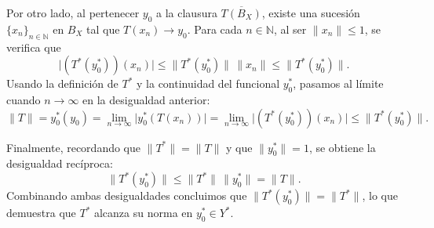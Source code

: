 \documentclass[12pt]{article}
\begin{document}
\begin{ejercicio}
        Por otro lado, al pertenecer $y_0$ a la clausura $\overline{T(B_X)}$, existe una sucesión $\{x_n\}_{n \in \mathbb{N}}$ en $B_X$ tal que $T(x_n) \to y_0$. Para cada $n \in \mathbb{N}$, al ser $\|x_n\| \leq 1$, se verifica que
        \begin{equation*}
            \bigl|(T^\ast(y_0^\ast))(x_n)\bigr| \leq \|T^\ast(y_0^\ast)\| \, \|x_n\| \leq \|T^\ast(y_0^\ast)\|.
        \end{equation*}
        Usando la definición de $T^\ast$ y la continuidad del funcional $y_0^\ast$, pasamos al límite cuando $n \to \infty$ en la desigualdad anterior:
        \begin{equation*}
            \|T\| = y_0^\ast(y_0) = \lim_{n \to \infty} \bigl|y_0^\ast(T(x_n))\bigr| = \lim_{n \to \infty} \bigl|(T^\ast(y_0^\ast))(x_n)\bigr| \leq \|T^\ast(y_0^\ast)\|.
        \end{equation*}

        Finalmente, recordando que $\|T^\ast\| = \|T\|$ y que $\|y_0^\ast\| = 1$, se obtiene la desigualdad recíproca:
        \begin{equation*}
            \|T^\ast(y_0^\ast)\| \leq \|T^\ast\| \, \|y_0^\ast\| = \|T\|.
        \end{equation*}
        Combinando ambas desigualdades concluimos que $\|T^\ast(y_0^\ast)\| = \|T^\ast\|$, lo que demuestra que $T^\ast$ alcanza su norma en $y_0^\ast \in Y^\ast$.
    \end{ejercicio}
\end{document}
